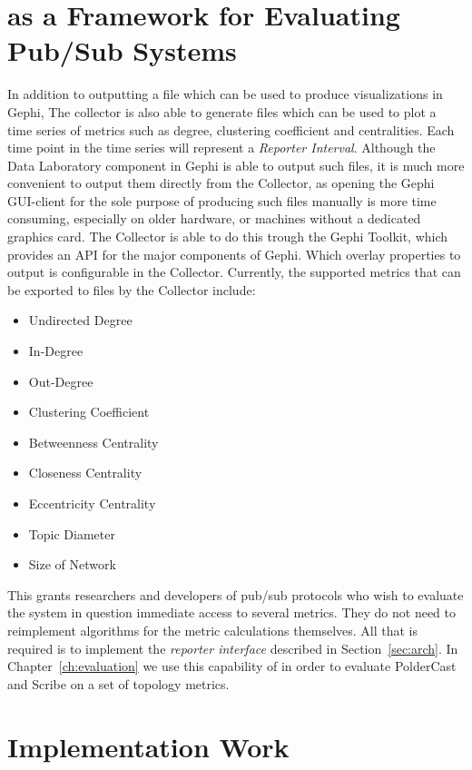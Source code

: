 \section{\demo as a Framework for Evaluating Pub/Sub Systems}
\label{sec:viz_eval}

In addition to outputting a \gexf file which can be used to produce
visualizations in Gephi, The collector is also able to generate \csv
files which can be used to plot a time series of metrics such as degree,
clustering coefficient and centralities. Each time point in the time
series will represent a \emph{Reporter Interval}. Although the Data
Laboratory component in Gephi is able to output such \csv files, it is
much more convenient to output them directly from the Collector, as
opening the Gephi GUI-client for the sole purpose of producing such
files manually is more time consuming, especially on older hardware, or
machines without a dedicated graphics card. The Collector is able to do
this trough the Gephi Toolkit, which provides an API for the major
components of Gephi. Which overlay properties to
output is configurable in the Collector.  Currently, the supported
metrics that can be exported to \csv files by the Collector include:

\begin{itemize}
    \item Undirected Degree
    \item In-Degree
    \item Out-Degree
    \item Clustering Coefficient
    \item Betweenness Centrality
    \item Closeness Centrality
    \item Eccentricity Centrality
    \item Topic Diameter
    \item Size of Network
\end{itemize}

This grants researchers and developers of pub/sub protocols who wish to evaluate
the system in question immediate access to several metrics. They do not need to
reimplement algorithms for the metric calculations themselves. All that is
required is to implement the \emph{reporter interface} described in
Section~\ref{sec:arch}. In Chapter~\ref{ch:evaluation} we use this capability of \demo in
order to evaluate PolderCast and Scribe on a set of topology metrics.

\section{Implementation Work}


